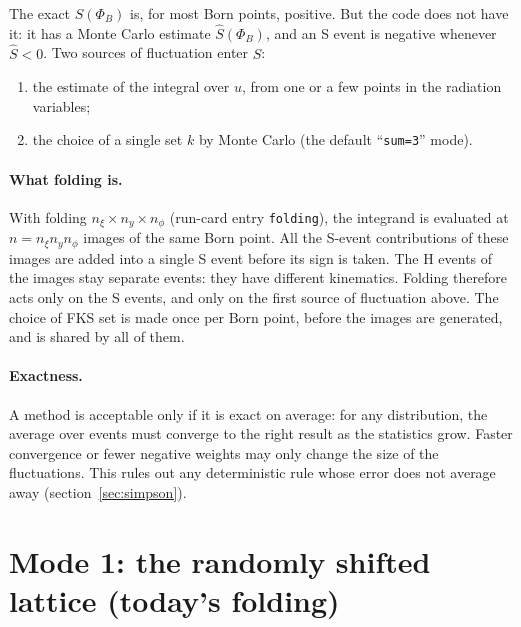 \documentclass[11pt,a4paper]{article}
\newcommand{\code}[1]{\texttt{#1}}
\begin{document}
The exact $S(\Phi_B)$ is, for most Born points, positive. But the code does not have it: it
has a Monte Carlo estimate $\hat S(\Phi_B)$, and an S event is negative whenever $\hat S<0$.
Two sources of fluctuation enter $\hat S$:
\begin{enumerate}
\item the estimate of the integral over $u$, from one or a few points in the radiation variables;
\item the choice of a single set $k$ by Monte Carlo (the default ``\code{sum=3}'' mode).
\end{enumerate}

\paragraph{What folding is.}
With folding $n_\xi\times n_y\times n_\phi$ (run-card entry \code{folding}), the integrand is
evaluated at $n=n_\xi n_y n_\phi$ images of the same Born point. All the S-event
contributions of these images are added into a single S event before its sign is taken.
The H events of the images stay separate events: they have different kinematics. Folding
therefore acts only on the S events, and only on the first source of fluctuation above. The
choice of FKS set is made once per Born point, before the images are generated, and is
shared by all of them.

\paragraph{Exactness.}
A method is acceptable only if it is exact on average: for any distribution, the average
over events must converge to the right result as the statistics grow. Faster convergence
or fewer negative weights may only change the size of the fluctuations. This rules out
any deterministic rule whose error does not average away (section~\ref{sec:simpson}).

\section{Mode 1: the randomly shifted lattice (today's folding)}
\label{sec:lattice}
\end{document}
